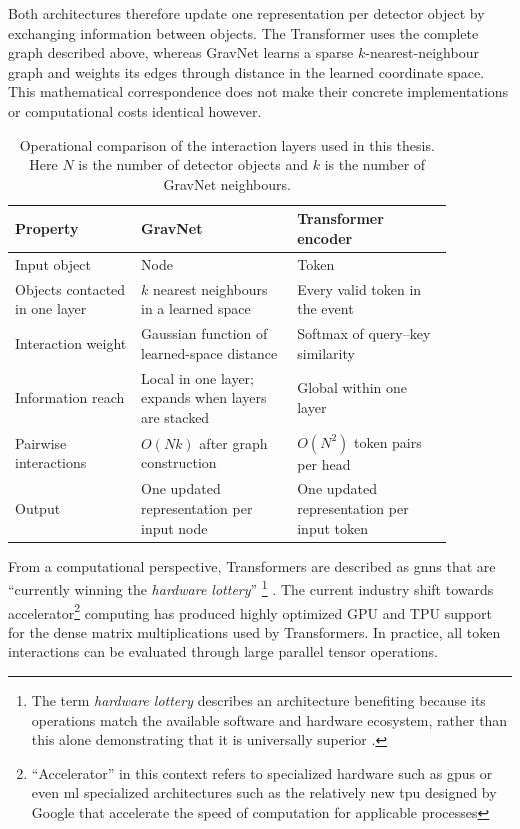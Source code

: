 Both architectures therefore update one representation per detector object by
exchanging information between objects. The Transformer uses the complete
graph described above, whereas GravNet learns a sparse \(k\)-nearest-neighbour
graph and weights its edges through distance in the learned coordinate space.
This mathematical correspondence does not make their concrete implementations
or computational costs identical however.

\begin{table}[htbp]
    \centering
    \small
    \caption{Operational comparison of the interaction layers used in this
    thesis. Here \(N\) is the number of detector objects and \(k\) is the
    number of GravNet neighbours.}
    \label{tab:gravnet_transformer_comparison}
    \begin{tabular}{p{0.25\linewidth} p{0.31\linewidth} p{0.31\linewidth}}
        \hline
        Property & GravNet & Transformer encoder \\
        \hline
        Input object & Node & Token \\
        Objects contacted in one layer &
        \(k\) nearest neighbours in a learned space &
        Every valid token in the event \\
        Interaction weight &
        Gaussian function of learned-space distance &
        Softmax of query--key similarity \\
        Information reach &
        Local in one layer; expands when layers are stacked &
        Global within one layer \\
        Pairwise interactions &
        \(O(Nk)\) after graph construction &
        \(O(N^2)\) token pairs per head \\
        Output &
        One updated representation per input node &
        One updated representation per input token \\
        \hline
    \end{tabular}
\end{table}

From a computational perspective, Transformers are described as \gls{gnn}s that are
``currently winning the \textit{hardware lottery}'' \footnote{The term \emph{hardware lottery} describes an architecture benefiting because
its operations match the available software and hardware ecosystem, rather
than this alone demonstrating that it is universally superior
\cite{hooker2020hardwarelottery}.} \cite{joshi2025transformersgnn}. The current industry shift towards
accelerator\footnote{``Accelerator'' in this context refers to specialized hardware such as \glspl{gpu} or even \gls{ml} specialized architectures such as the relatively new \gls{tpu} designed by Google that accelerate the speed of computation for applicable processes\cite{needed}} computing has produced highly optimized GPU and TPU support for
the dense matrix multiplications used by Transformers. In practice, all
token interactions can be evaluated through large parallel tensor operations.

